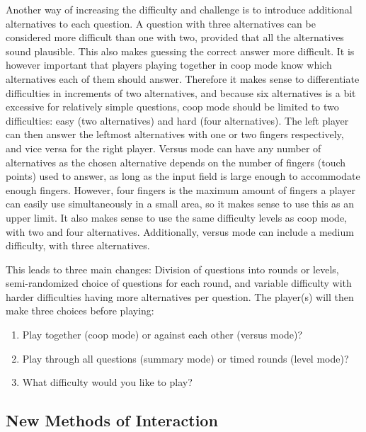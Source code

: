 Another way of increasing the difficulty and challenge is to introduce additional alternatives to each question. A question with three alternatives can be considered more difficult than one with two, provided that all the alternatives sound plausible. This also makes guessing the correct answer more difficult. It is however important that players playing together in coop mode know which alternatives each of them should answer. Therefore it makes sense to differentiate difficulties in increments of two alternatives, and because six alternatives is a bit excessive for relatively simple questions, coop mode should be limited to two difficulties: easy (two alternatives) and hard (four alternatives). The left player can then answer the leftmost alternatives with one or two fingers respectively, and vice versa for the right player. Versus mode can have any number of alternatives as the chosen alternative depends on the number of fingers (touch points) used to answer, as long as the input field is large enough to accommodate enough fingers. However, four fingers is the maximum amount of fingers a player can easily use simultaneously in a small area, so it makes sense to use this as an upper limit. It also makes sense to use the same difficulty levels as coop mode, with two and four alternatives. Additionally, versus mode can include a medium difficulty, with three alternatives.

This leads to three main changes: Division of questions into rounds or levels, semi-randomized choice of questions for each round, and variable difficulty with harder difficulties having more alternatives per question. The player(s) will then make three choices before playing:
\begin{enumerate}
	\item Play together (coop mode) or against each other (versus mode)?
	\item Play through all questions (summary mode) or timed rounds (level mode)?
	\item What difficulty would you like to play?
\end{enumerate}


\subsection{New Methods of Interaction}

